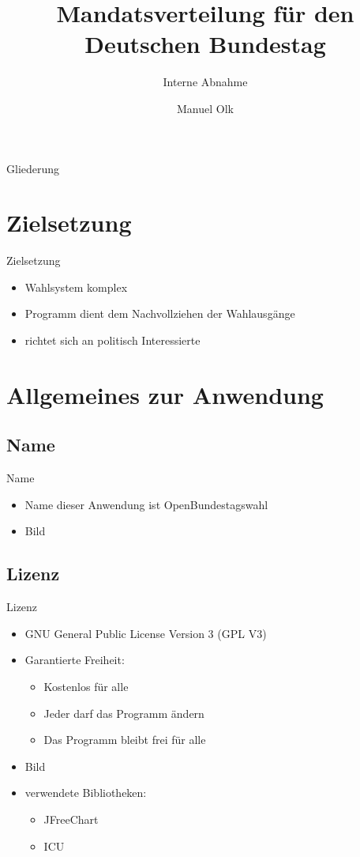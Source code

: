 \documentclass[18pt]{beamer}
\title[Interne Abnahme]{Mandatsverteilung für den Deutschen Bundestag}
\subtitle{Interne Abnahme}
\author{Manuel Olk}
\institute{Praxis der Softwareentwicklung, WS 2013/14}
\begin{document}

\begin{frame}
\titlepage
\end{frame}

\begin{frame}{Gliederung}
\tableofcontents
\end{frame}


\section{Zielsetzung}
\begin{frame}{Zielsetzung}
\begin{itemize}
	\item Wahlsystem komplex
	\item Programm dient dem Nachvollziehen der Wahlausgänge
	\item richtet sich an politisch Interessierte
\end{itemize}
\end{frame}

\section{Allgemeines zur Anwendung}
\subsection{Name}
\begin{frame}{Name}
\begin{itemize}
	\item Name dieser Anwendung ist OpenBundestagswahl
	\item Bild
\end{itemize}
\end{frame}


\subsection{Lizenz}
\begin{frame}{Lizenz}
\begin{itemize}
	\item GNU General Public License Version 3 (GPL V3)
	\item Garantierte Freiheit:
	\begin{itemize}
		\item Kostenlos für alle
		\item Jeder darf das Programm ändern
		\item Das Programm bleibt frei für alle
	\end{itemize}
	\item Bild
	\item verwendete Bibliotheken:
	\begin{itemize}
		\item JFreeChart
		\item ICU
	\end{itemize}
\end{itemize}
\end{frame}
\end{document}
